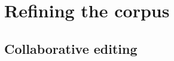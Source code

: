 

\section{Refining the corpus}
\label{sec:refiningcorpus}

\subsection{Collaborative editing}
\label{sec:collaborative}


